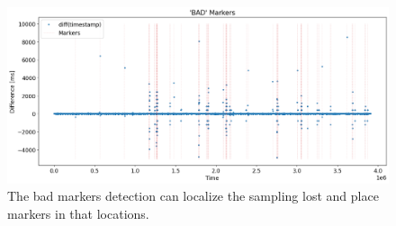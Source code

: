 
\begin{figure}
\begin{centering}
% 
\includegraphics[width=1\textwidth]{Cap3/Figures/bad_markers_autodetection.png}
\par\end{centering}
\caption[Bad markers detection]{The bad markers detection can localize the sampling lost and place markers in that locations.}
\label{fig:bad_markers_autodetection}
\end{figure}